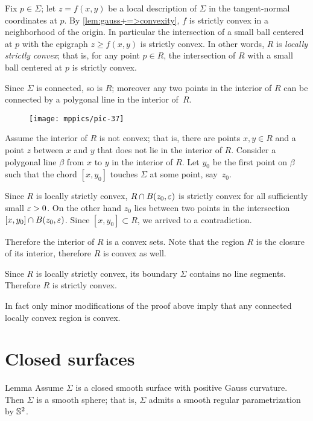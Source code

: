 Fix $p\in\Sigma$; let $z=f(x,y)$ be a local description of $\Sigma$ in the tangent-normal coordinates at $p$.
By \ref{lem:gauss+=>convexity}, $f$ is strictly convex in a neighborhood of the origin.
In particular the intersection of a small ball centered at $p$ with the epigraph $z\ge f(x,y)$ is strictly convex.
In other words, $R$ is \emph{locally strictly convex};
that is, for any point $p\in R$, the intersection of $R$ with a small ball centered at $p$ is strictly convex.

Since $\Sigma$ is connected, so is $R$;
moreover any two points in the interior of $R$ can be connected by a polygonal line in the interior of~$R$.

\begin{wrapfigure}{r}{43 mm}
\vskip-0mm
\centering
\texttt{[image: mppics/pic-37]}
\vskip-0mm
\end{wrapfigure}

Assume the interior of $R$ is not convex; that is, there are points $x,y\in R$ and a point $z$ between $x$ and $y$ that does not lie in the interior of $R$.
Consider a polygonal  line $\beta$ from $x$ to $y$ in the interior of $R$.
Let $y_0$ be the first point on $\beta$ such that the chord $[x,y_0]$ touches $\Sigma$ at some point, say~$z_0$.

Since $R$ is locally strictly convex, $R\cap B(z_0,\varepsilon)$ is strictly convex for all sufficiently small $\varepsilon>0$.
On the other hand $z_0$ lies between two points in the intersection $[x,y_0]\cap B(z_0,\varepsilon)$.
Since $[x,y_0]\subset R$, we arrived to a contradiction.

Therefore the interior of $R$ is a convex sets.
Note that the region $R$ is the closure of its interior, therefore $R$ is convex as well.

Since $R$ is locally strictly convex, its boundary $\Sigma$ contains no line segments.
Therefore $R$ is strictly convex.
\qeds

In fact only minor modifications of the proof above imply that
any connected locally convex region is convex.


\section*{Closed surfaces}

\begin{thm}{Lemma}\label{lem:gauss=sphere}
Assume $\Sigma$ is a closed smooth surface with positive Gauss curvature.
Then $\Sigma$ is a smooth sphere; that is, $\Sigma$ admits a smooth regular parametrization by $\mathbb{S}^2$.
\end{thm}

